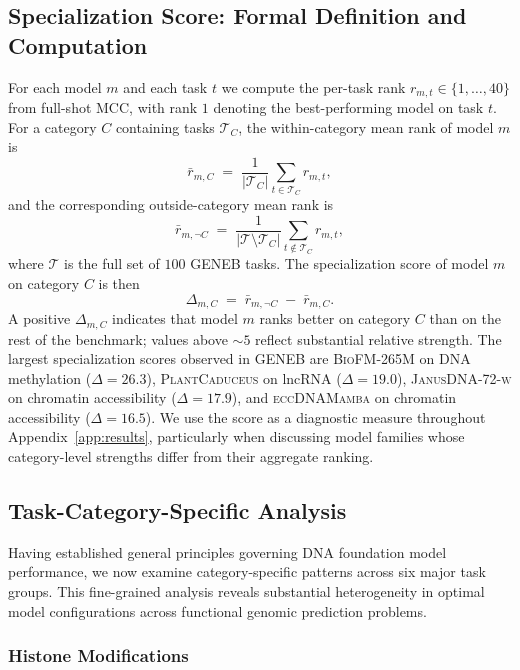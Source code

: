 \documentclass{llmxive}
\begin{document}
\subsection{Specialization Score: Formal Definition and Computation}
\label{subsec:specialization}

For each model $m$ and each task $t$ we compute the per-task rank
$r_{m,t} \in \{1, \ldots, 40\}$ from full-shot MCC, with rank $1$
denoting the best-performing model on task $t$. For a category
$C$ containing tasks $\mathcal{T}_C$, the within-category mean rank
of model $m$ is
\[
\bar{r}_{m,C} \;=\; \frac{1}{|\mathcal{T}_C|}\sum_{t\in\mathcal{T}_C} r_{m,t},
\]
and the corresponding outside-category mean rank is
\[
\bar{r}_{m,\neg C} \;=\; \frac{1}{|\mathcal{T}\setminus\mathcal{T}_C|}\sum_{t\notin\mathcal{T}_C} r_{m,t},
\]
where $\mathcal{T}$ is the full set of $100$ GENEB tasks. The
specialization score of model $m$ on category $C$ is then
\[
\Delta_{m,C} \;=\; \bar{r}_{m,\neg C} \;-\; \bar{r}_{m,C}.
\]
A positive $\Delta_{m,C}$ indicates that model $m$ ranks better on
category $C$ than on the rest of the benchmark; values above $\sim 5$
reflect substantial relative strength. The largest specialization
scores observed in GENEB are
\textsc{BioFM-265M} on DNA methylation ($\Delta = 26.3$),
\textsc{PlantCaduceus} on lncRNA ($\Delta = 19.0$),
\textsc{JanusDNA-72-w} on chromatin accessibility ($\Delta = 17.9$),
and \textsc{eccDNAMamba} on chromatin accessibility ($\Delta = 16.5$).
We use the score as a diagnostic measure throughout
Appendix~\ref{app:results}, particularly when discussing model families
whose category-level strengths differ from their aggregate ranking.



\subsection{Task-Category-Specific Analysis}
\label{subsec:task_categories}

Having established general principles governing DNA foundation model performance, we now examine category-specific patterns across six major task groups. This fine-grained analysis reveals substantial heterogeneity in optimal model configurations across functional genomic prediction problems.

\subsubsection{Histone Modifications}
\end{document}
